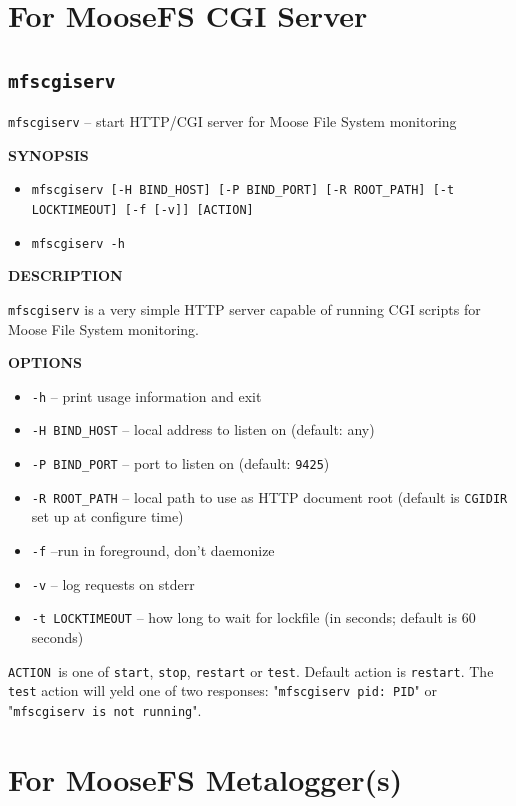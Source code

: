 \documentclass[a4paper,11pt,english]{report}
\def\code#1{\texttt{#1}}
\begin{document}
		\section{For MooseFS CGI Server}
			\subsection{\code{mfscgiserv}}
				\code{mfscgiserv} -- start HTTP/CGI server for Moose File System monitoring
				\bigskip
				
				\textbf{SYNOPSIS}
				\begin{itemize}
					\item \code{mfscgiserv  [-H  BIND\_HOST] [-P BIND\_PORT] [-R ROOT\_PATH] [-t LOCKTIMEOUT] [-f [-v]] [ACTION]}
					\item \code{mfscgiserv -h}
				\end{itemize}
				\bigskip
				
				\textbf{DESCRIPTION}
				
				\code{mfscgiserv} is a very simple HTTP server capable of running CGI  scripts for Moose File System monitoring.

				\bigskip
				\textbf{OPTIONS}
				\begin{itemize}
					\item \code{-h} -- print usage information and exit
					\item \code{-H BIND\_HOST} -- local address to listen on (default: any)
					\item \code{-P BIND\_PORT} -- port to listen on (default: \code{9425})
					\item \code{-R ROOT\_PATH} -- local  path  to use as HTTP document root (default is \code{CGIDIR} set up at configure time)
					\item \code{-f} --run in foreground, don't daemonize
					\item \code{-v} -- log requests on stderr
					\item \code{-t LOCKTIMEOUT} -- how long to wait for lockfile (in seconds; default  is  60  seconds)
				\end{itemize}
				
				\bigskip				
				\code{ACTION }is  one  of  \code{start},  \code{stop},  \code{restart}  or  \code{test}. Default action is
					\code{restart}. The \code{test} action will yeld one of two responses:
					"\code{mfscgiserv pid: PID}" or "\code{mfscgiserv is not running}".
					
		\section{For MooseFS Metalogger(s)}
\end{document}
